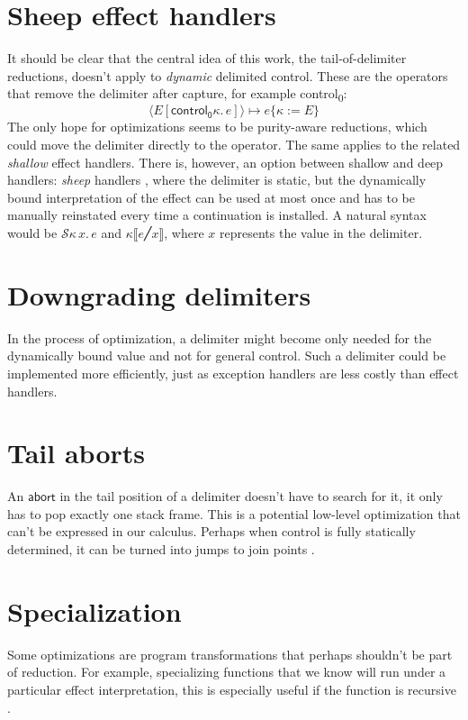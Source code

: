 \documentclass[a4paper, 11pt,titlepage, openright, twoside]{report}
\newcommand{\abort}{\textsf{abort}}
\newcommand{\subst}[2]{\{#1{:=}#2\}}
\renewcommand{\S}{\mathcal{S}}
\newcommand{\A}{\mathcal{A}}
\newcommand{\+}{\enspace}
\begin{document}

\section{Sheep effect handlers}
It should be clear that the central idea of this work, the tail-of-delimiter reductions,
doesn't apply to \textit{dynamic} delimited control.
These are the operators that remove the delimiter after capture,
for example \textsf{control\textsubscript{0}}:
$$⟨E[\mathsf{control_0} κ.\,e]⟩ ↦ e\subst{κ}{E}$$
The only hope for optimizations seems to be purity-aware reductions,
which could move the delimiter directly to the operator. The same applies to the related \textit{shallow} effect handlers.
There is, however, an option between shallow and deep handlers: \textit{sheep} handlers \cite{sheep},
where the delimiter is static,
but the dynamically bound interpretation of the effect can be used at most once
and has to be manually reinstated every time a continuation is installed.
A natural syntax would be $\S κ\,x.\,e$ and $κ⟦e╱x⟧$, where $x$ represents the value in the delimiter.

\section{Downgrading delimiters}
In the process of optimization,
a delimiter might become only needed for the dynamically bound value
and not for general control.
Such a delimiter could be implemented more efficiently,
just as exception handlers are less costly than effect handlers.

\section{Tail aborts}
An $\abort$ in the tail position of a delimiter
doesn't have to search for it,
it only has to pop exactly one stack frame.
This is a potential low-level optimization that can't be expressed in our calculus.
Perhaps when control is fully statically determined,
it can be turned into jumps to join points \cite{cwc}.

\section{Specialization}
Some optimizations are program transformations that perhaps shouldn't be part of reduction.
For example, specializing functions that we know will run under a particular effect interpretation,
this is especially useful if the function is recursive \cite{saleh,karachalias}.
\end{document}
